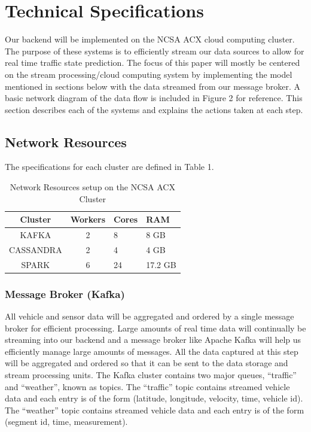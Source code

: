 \documentclass{vldb}
\begin{document}
\section{Technical Specifications}
Our backend will be implemented on the NCSA ACX cloud computing cluster. The purpose of these systems is to efficiently stream our data sources to allow for real time traffic state prediction. The focus of this paper will mostly be centered on the stream processing/cloud computing system by implementing the model mentioned in sections below with the data streamed from our message broker. A basic network diagram of the data flow is included in Figure 2 for reference. This section describes each of the systems and explains the actions taken at each step.

\subsection{Network Resources}

The specifications for each cluster are defined in Table 1. 

\begin{table}
\centering
\caption{Network Resources setup on the NCSA ACX Cluster}
\begin{tabular}{|c|c|l|l|} \hline
Cluster&Workers&Cores&RAM\\ \hline
KAFKA & 2 & 8 & 8 GB\\ \hline
CASSANDRA & 2 & 4 & 4 GB\\ \hline
SPARK & 6 & 24 & 17.2 GB \\ \hline
\end{tabular}
\end{table}

\subsubsection{Message Broker (Kafka)}
All vehicle and sensor data will be aggregated and ordered by a single message broker for efficient processing. Large amounts of real time data will continually be streaming into our backend and a message broker like Apache Kafka will help us efficiently manage large amounts of messages. All the data captured at this step will be aggregated and ordered so that it can be sent to the data storage and stream processing units. The Kafka cluster contains two major queues, “traffic” and “weather”, known as topics. The “traffic” topic contains streamed vehicle data and each entry is of the form (latitude, longitude, velocity, time, vehicle id). The “weather” topic contains streamed vehicle data and each entry is of the form (segment id, time, measurement).
\end{document}
